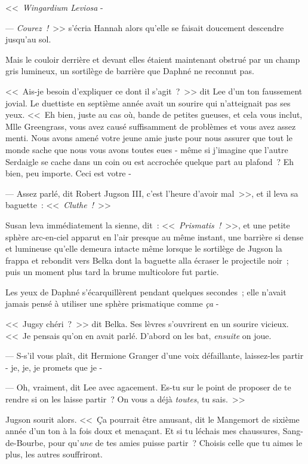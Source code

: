 <<~\emph{Wingardium Leviosa} -

--- \emph{Courez~!}~>> s'écria Hannah alors qu'elle se faisait doucement descendre jusqu'au sol.

Mais le couloir derrière et devant elles étaient maintenant obstrué par un champ gris lumineux, un sortilège de barrière que Daphné ne reconnut pas.

<<~Ais-je besoin d'expliquer ce dont il s'agit~?~>> dit Lee d'un ton faussement jovial. Le duettiste en septième année avait un sourire qui n'atteignait pas ses yeux. <<~Eh bien, juste au cas où, bande de petites gueuses, et cela vous inclut, Mlle Greengrass, vous avez causé suffisamment de problèmes et vous avez assez menti. Nous avons amené votre jeune amie juste pour nous assurer que tout le monde sache que nous vous avons toutes eues - même si j'imagine que l'autre Serdaigle se cache dans un coin ou est accrochée quelque part au plafond~? Eh bien, peu importe. Ceci est votre -

--- Assez parlé, dit Robert Jugson III, c'est l'heure d'avoir mal~>>, et il leva sa baguette~: <<~\emph{Cluthe~!}~>>

Susan leva immédiatement la sienne, dit~: <<~\emph{Prismatis~!}~>>, et une petite sphère arc-en-ciel apparut en l'air presque au même instant, une barrière si dense et lumineuse qu'elle demeura intacte même lorsque le sortilège de Jugson la frappa et rebondit vers Belka dont la baguette alla écraser le projectile noir~; puis un moment plus tard la brume multicolore fut partie.

Les yeux de Daphné s'écarquillèrent pendant quelques secondes~; elle n'avait jamais pensé à utiliser une sphère prismatique comme \emph{ça} -

<<~Jugsy chéri~?~>> dit Belka. Ses lèvres s'ouvrirent en un sourire vicieux. <<~Je pensais qu'on en avait parlé. D'abord on les bat, \emph{ensuite} on joue.

--- S-s'il vous plaît, dit Hermione Granger d'une voix défaillante, laissez-les partir - je, je, je promets que je -

--- Oh, vraiment, dit Lee avec agacement. Es-tu sur le point de proposer de te rendre si on les laisse partir~? On vous a déjà \emph{toutes}, tu sais.~>>

Jugson sourit alors. <<~Ça pourrait être amusant, dit le Mangemort de sixième année d'un ton à la fois doux et menaçant. Et si tu léchais mes chaussures, Sang-de-Bourbe, pour qu'\emph{une} de tes amies puisse partir~? Choisis celle que tu aimes le plus, les autres souffriront.

